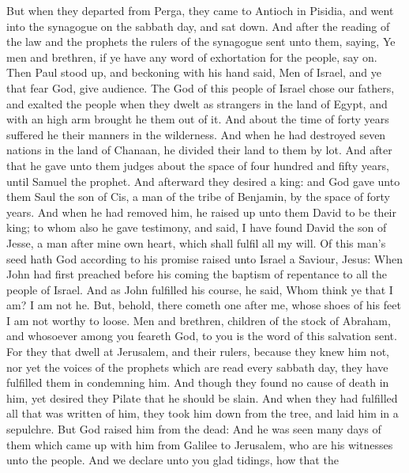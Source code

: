  But when they departed from Perga, they came to Antioch
in Pisidia, and went into the synagogue on the sabbath day, and sat
down.  And after the reading of the law and the prophets
the rulers of the synagogue sent unto them, saying, Ye men and brethren,
if ye have any word of exhortation for the people, say on.
 Then Paul stood up, and beckoning with his hand said,
Men of Israel, and ye that fear God, give audience.  The
God of this people of Israel chose our fathers, and exalted the people
when they dwelt as strangers in the land of Egypt, and with an high arm
brought he them out of it.  And about the time of forty
years suffered he their manners in the wilderness.  And
when he had destroyed seven nations in the land of Chanaan, he divided
their land to them by lot.  And after that he gave unto
them judges about the space of four hundred and fifty years, until
Samuel the prophet.  And afterward they desired a king:
and God gave unto them Saul the son of Cis, a man of the tribe of
Benjamin, by the space of forty years.  And when he had
removed him, he raised up unto them David to be their king; to whom also
he gave testimony, and said, I have found David the son of Jesse, a man
after mine own heart, which shall fulfil all my will.  Of
this man's seed hath God according to his promise raised unto Israel a
Saviour, Jesus:  When John had first preached before his
coming the baptism of repentance to all the people of Israel.
 And as John fulfilled his course, he said, Whom think ye
that I am? I am not he. But, behold, there cometh one after me, whose
shoes of his feet I am not worthy to loose.  Men and
brethren, children of the stock of Abraham, and whosoever among you
feareth God, to you is the word of this salvation sent. 
For they that dwell at Jerusalem, and their rulers, because they knew
him not, nor yet the voices of the prophets which are read every sabbath
day, they have fulfilled them in condemning him.  And
though they found no cause of death in him, yet desired they Pilate that
he should be slain.  And when they had fulfilled all that
was written of him, they took him down from the tree, and laid him in a
sepulchre.  But God raised him from the dead:
 And he was seen many days of them which came up with him
from Galilee to Jerusalem, who are his witnesses unto the people.
 And we declare unto you glad tidings, how that the

